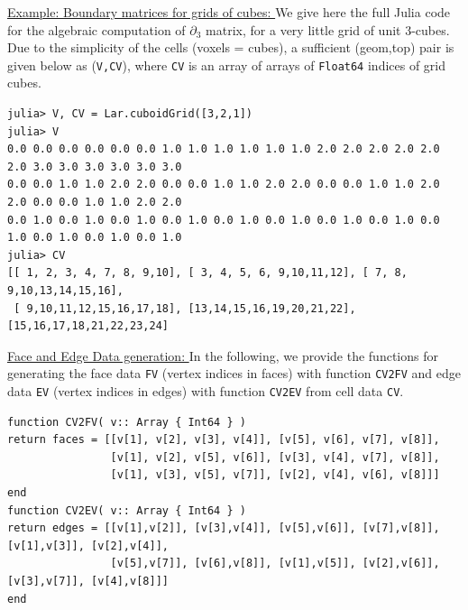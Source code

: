 \documentclass{article}
\begin{document}
\vspace{10pt}
\noindent\underline{
Example: Boundary matrices for grids of cubes:
}\vspace{0.2em}\newline 
We give here the full Julia code for the algebraic computation of $\partial_3$ matrix, for a very little grid of unit
3-cubes. Due to the simplicity of the cells (voxels = cubes), a sufficient (geom,top) pair is given below
as (\texttt{V,CV}), where \texttt{CV} is an array of arrays of \texttt{Float64} indices of grid cubes.

\begin{Verbatim}[fontsize=\footnotesize]
julia> V, CV = Lar.cuboidGrid([3,2,1])
julia> V
0.0 0.0 0.0 0.0 0.0 0.0 1.0 1.0 1.0 1.0 1.0 1.0 2.0 2.0 2.0 2.0 2.0 2.0 3.0 3.0 3.0 3.0 3.0 3.0
0.0 0.0 1.0 1.0 2.0 2.0 0.0 0.0 1.0 1.0 2.0 2.0 0.0 0.0 1.0 1.0 2.0 2.0 0.0 0.0 1.0 1.0 2.0 2.0
0.0 1.0 0.0 1.0 0.0 1.0 0.0 1.0 0.0 1.0 0.0 1.0 0.0 1.0 0.0 1.0 0.0 1.0 0.0 1.0 0.0 1.0 0.0 1.0
julia> CV
[[ 1, 2, 3, 4, 7, 8, 9,10], [ 3, 4, 5, 6, 9,10,11,12], [ 7, 8, 9,10,13,14,15,16],
 [ 9,10,11,12,15,16,17,18], [13,14,15,16,19,20,21,22], [15,16,17,18,21,22,23,24]
\end{Verbatim}

\vspace{10pt}
\noindent\underline{
Face and Edge Data generation:
}\vspace{0.2em}\newline 
In the following, we provide the functions for generating the face data \texttt{FV} (vertex indices in faces) with function  \texttt{CV2FV} and edge data \texttt{EV} (vertex indices in edges) with function \texttt{CV2EV} from cell data \texttt{CV}. 



\begin{Verbatim}[fontsize=\footnotesize]
function CV2FV( v:: Array { Int64 } )
return faces = [[v[1], v[2], v[3], v[4]], [v[5], v[6], v[7], v[8]],
                [v[1], v[2], v[5], v[6]], [v[3], v[4], v[7], v[8]],
                [v[1], v[3], v[5], v[7]], [v[2], v[4], v[6], v[8]]]
end
function CV2EV( v:: Array { Int64 } )
return edges = [[v[1],v[2]], [v[3],v[4]], [v[5],v[6]], [v[7],v[8]], [v[1],v[3]], [v[2],v[4]],
                [v[5],v[7]], [v[6],v[8]], [v[1],v[5]], [v[2],v[6]], [v[3],v[7]], [v[4],v[8]]]
end
\end{Verbatim}
\end{document}
